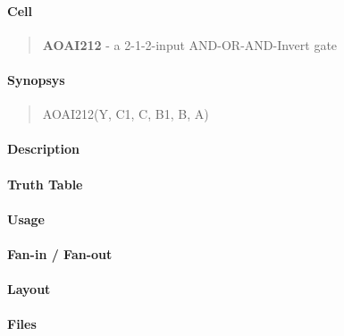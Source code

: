 \label{AOAI212}
\paragraph{Cell}
\begin{quote}
    \textbf{AOAI212} - a 2-1-2-input AND-OR-AND-Invert gate
\end{quote}

\paragraph{Synopsys}
\begin{quote}
    AOAI212(Y, C1, C, B1, B, A)
\end{quote}

\paragraph{Description}

%

\paragraph{Truth Table}
%

\paragraph{Usage}

\paragraph{Fan-in / Fan-out}

\paragraph{Layout}

\paragraph{Files}
